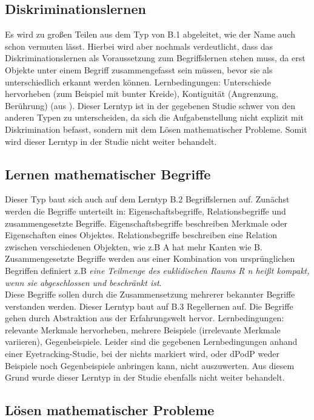 \subsection[]{Diskriminationslernen}

Es wird zu großen Teilen aus dem Typ von B.1 abgeleitet, wie der Name auch schon vermuten lässt. Hierbei wird aber nochmals verdeutlicht, dass das Diskriminationslernen als Voraussetzung zum Begriffslernen stehen muss, da erst Objekte unter einem Begriff zusammengefasst sein müssen, bevor sie als unterschiedlich erkannt werden können.
Lernbedingungen: Unterschiede hervorheben (zum Beispiel mit bunter Kreide), Kontiguität (Angrenzung, Berührung) (aus \cite{DudenKontiguitaet}).
Dieser Lerntyp ist in der gegebenen Studie schwer von den anderen Typen zu unterscheiden, da sich die Aufgabenstellung nicht explizit mit Diskrimination befasst, sondern mit dem Lösen mathematischer Probleme. Somit wird dieser Lerntyp in der Studie nicht weiter behandelt.

\subsection[]{Lernen mathematischer Begriffe}

Dieser Typ baut sich auch auf dem Lerntyp B.2 Begriffslernen auf. Zunächst werden die Begriffe unterteilt in: Eigenschaftsbegriffe, Relationsbegriffe und zusammengesetzte Begriffe. Eigenschaftsbegriffe beschreiben Merkmale oder Eigenschaften eines Objektes. Relationsbegriffe beschreiben eine Relation zwischen verschiedenen Objekten, wie z.B A hat mehr Kanten wie B. Zusammengesetzte Begriffe werden aus einer Kombination von ursprünglichen Begriffen definiert z.B \textit {eine Teilmenge des euklidischen Raums R n heißt kompakt, wenn sie abgeschlossen und beschränkt ist}.\\ Diese Begriffe sollen durch die Zusammensetzung mehrerer bekannter Begriffe verstanden werden. Dieser Lerntyp baut auf B.3 Regellernen auf. Die Begriffe gehen durch Abstraktion aus der Erfahrungswelt hervor.
Lernbedingungen: relevante Merkmale hervorheben, mehrere Beispiele (irrelevante Merkmale variieren), Gegenbeispiele.
Leider sind die gegebenen Lernbedingungen anhand einer Eyetracking-Studie, bei der nichts markiert wird, oder \gls{dPodP} weder Beispiele noch Gegenbeispiele anbringen kann, nicht auszuwerten. Aus diesem Grund wurde dieser Lerntyp in der Studie ebenfalls nicht weiter behandelt. 

\subsection[]{Lösen mathematischer Probleme}

